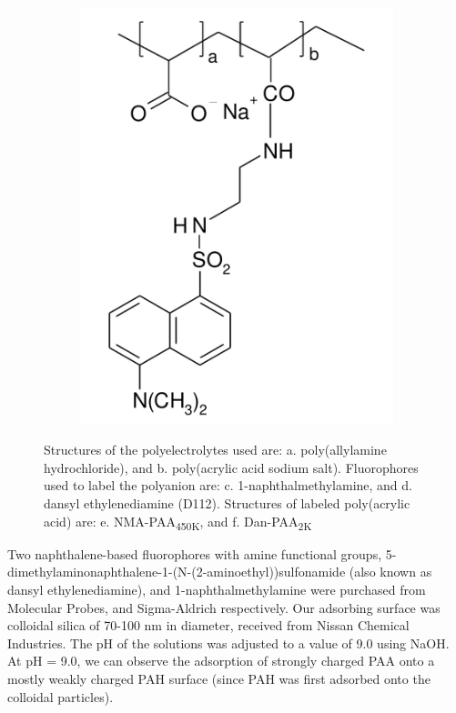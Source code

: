 \documentclass[journal=mamobx,manuscript=article]{achemso}
\begin{document}
\begin{figure}[H]
\begin{subfigure}[b]{0.35\textwidth}
        \caption{}
        \label{fig:E}
    \end{subfigure}
    \begin{subfigure}[b]{0.35\textwidth}
        \centering
        \includegraphics[scale=0.35]{F.pdf}
        \caption{}
        \label{fig:f}
    \end{subfigure}
    \caption{Structures of the polyelectrolytes used are: a. poly(allylamine hydrochloride), and b. poly(acrylic acid sodium salt).  Fluorophores used to label the polyanion are: c. 1-naphthalmethylamine, and d. dansyl ethylenediamine (D112).  Structures of labeled poly(acrylic acid) are: e. NMA-PAA\textsubscript{450K}, and f. Dan-PAA\textsubscript{2K} }
    \label{figure 1}
\end{figure}


Two naphthalene-based fluorophores with amine functional groups, 5-dimethylaminonaphthalene-1-(N-(2-aminoethyl))sulfonamide (also known as dansyl ethylenediamine), and 1-naphthalmethylamine were purchased from Molecular Probes, and Sigma-Aldrich respectively.  Our adsorbing surface was colloidal silica of 70-100 nm in diameter, received from Nissan Chemical Industries. The pH of the solutions was adjusted to a value of 9.0 using NaOH.  At pH = 9.0, we can observe the adsorption of strongly charged PAA onto a mostly weakly charged PAH surface (since PAH was first adsorbed onto the colloidal particles).
\end{document}
